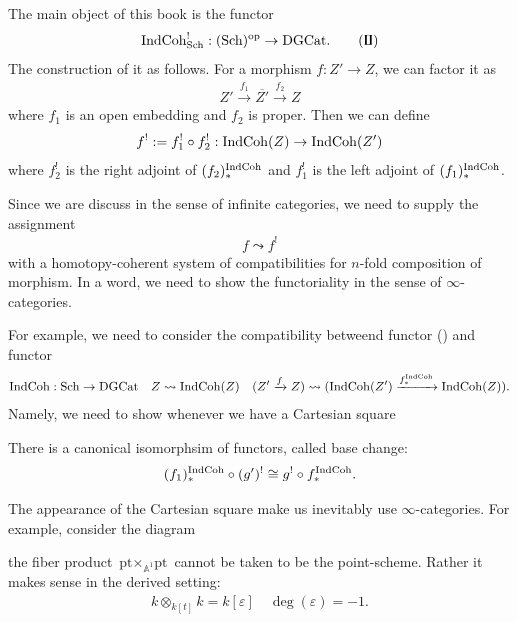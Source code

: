{The main object of this book is the functor 
\begin{align*}
    \operatorname{IndCoh}_{\operatorname{Sch}}^!:(\operatorname{Sch})^{\operatorname{op}} \to \text{DGCat}. \tag{\Gemini}
\end{align*}
The construction of it as follows. For a morphism $f:Z'\to Z$, we can factor it as 
\begin{align*}
    Z'\xrightarrow{f_1} \overline{Z'}\xrightarrow{f_2}Z
\end{align*}
where $f_1$ is an open embedding and $f_2$ is proper. Then we can define 
\begin{align*}
    f^!:=f_1^!\circ f_2^!:\operatorname{IndCoh}(Z)\to \operatorname{IndCoh}(Z') 
\end{align*}
where $f_2^!$ is the right adjoint of $(f_2)^{\operatorname{IndCoh}}_*$ and $f_1^!$ is the left adjoint of $(f_1)^{\operatorname{IndCoh}}_*$.

Since we are discuss in the sense of infinite categories, we need to supply the assignment 
\begin{align*}
    f \leadsto f^!
\end{align*}
with a homotopy-coherent system of compatibilities for $n$-fold composition of morphism.
In a word, we need to show the functoriality in the sense of $\infty$-categories.

For example, we need to consider the compatibility betweend functor (\Gemini) and functor
\begin{align*}
    \operatorname{IndCoh}: \operatorname{Sch} \to \text{DGCat} \quad
    Z \leadsto \operatorname{IndCoh}(Z) \quad (Z'\xrightarrow{f}Z)\leadsto(\operatorname{IndCoh}(Z')\xrightarrow{f_*^{\operatorname{IndCoh}}}\operatorname{IndCoh}(Z)).
\end{align*}
Namely, we need to show whenever we have a Cartesian square
\begin{center}
\end{center}
There is a canonical isomorphsim of functors, called base change:
\begin{align*}
    (f_1)_*^{\operatorname{IndCoh}}\circ (g')^!\cong g^!\circ f_*^{\operatorname{IndCoh}}.
\end{align*}

The appearance of the Cartesian square make us inevitably use $\infty$-categories. For example, consider the diagram
\begin{center}
\end{center}
the fiber product $\text{pt} \times_{\mathbb{A}^1} \text{pt}$  cannot be taken to be the point-scheme.
Rather it makes sense in the derived setting:
\begin{align*}
    k \otimes_{k[t]} k = k[\varepsilon] \quad \deg(\varepsilon)=-1.
\end{align*}
\endgroup}
